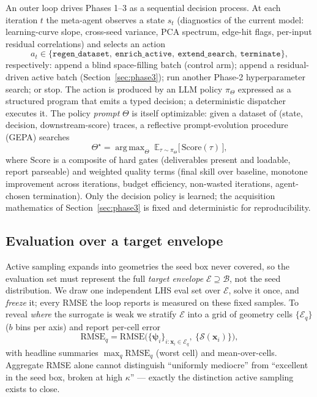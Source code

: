 \documentclass[11pt]{article}
\newcommand{\E}{\mathbb{E}}
\newcommand{\x}{\bm{x}}
\newcommand{\psiv}{\bm{\psi}}
\newcommand{\rmse}{\mathrm{RMSE}}
\DeclareMathOperator*{\argmax}{arg\,max}
\begin{document}
An outer loop drives Phases 1--3 as a sequential decision process. At each
iteration $t$ the meta-agent observes a state $s_t$ (diagnostics of the current
model: learning-curve slope, cross-seed variance, PCA spectrum, edge-hit flags,
per-input residual correlations) and selects an action
\begin{equation}
  a_t \in \{\texttt{regen\_dataset},\ \texttt{enrich\_active},\
  \texttt{extend\_search},\ \texttt{terminate}\},
\end{equation}
respectively: append a blind space-filling batch (control arm); append a
residual-driven active batch (Section~\ref{sec:phase3}); run another Phase-2
hyperparameter search; or stop. The action is produced by an LLM policy
$\pi_\Theta$ expressed as a structured program that emits a typed decision; a
deterministic dispatcher executes it. The policy \emph{prompt} $\Theta$ is
itself optimizable: given a dataset of (state, decision, downstream-score)
traces, a reflective prompt-evolution procedure (GEPA) searches
\begin{equation}
  \Theta^\star = \argmax_{\Theta}\;
  \E_{\tau\sim\pi_\Theta}\big[\,\mathrm{Score}(\tau)\,\big],
\end{equation}
where $\mathrm{Score}$ is a composite of hard gates (deliverables present and
loadable, report parseable) and weighted quality terms (final skill over
baseline, monotone improvement across iterations, budget efficiency,
non-wasted iterations, agent-chosen termination). Only the decision policy is
learned; the acquisition mathematics of Section~\ref{sec:phase3} is fixed and
deterministic for reproducibility.

\subsection{Evaluation over a target envelope}

Active sampling expands into geometries the seed box never covered, so the
evaluation set must represent the full \emph{target envelope}
$\mathcal{E}\supseteq\mathcal{B}$, not the seed distribution. We draw one
independent LHS eval set over $\mathcal{E}$, solve it once, and \emph{freeze}
it; every RMSE the loop reports is measured on these fixed samples. To reveal
\emph{where} the surrogate is weak we stratify $\mathcal{E}$ into a grid of
geometry cells $\{\mathcal{E}_q\}$ ($b$ bins per axis) and report per-cell
error
\begin{equation}
  \rmse_q = \rmse\!\big(\{\psiv_i\}_{i:\x_i\in\mathcal{E}_q},\ \{\mathcal{S}(\x_i)\}\big),
\end{equation}
with headline summaries $\max_q \rmse_q$ (worst cell) and mean-over-cells.
Aggregate RMSE alone cannot distinguish ``uniformly mediocre'' from ``excellent
in the seed box, broken at high $\kappa$'' --- exactly the distinction active
sampling exists to close.
\end{document}
